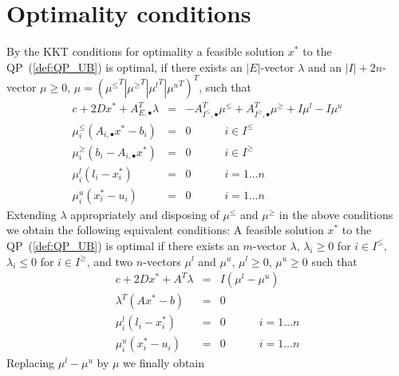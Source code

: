 \documentclass[a4paper]{article}
\begin{document}
\section{Optimality conditions}
By the KKT conditions for optimality a feasible solution $x^{*}$ to the
QP~(\ref{def:QP_UB}) is optimal, if there exists an $\left|E\right|$-vector
$\lambda$ and an $\left|I\right|+2n$-vector $\mu \geq 0$,
$\mu=\left({\mu^{\leq}}^{T}\left|\right. {\mu^{\geq}}^{T} \left|\right.
{\mu^{l}}^{T} \left|\right. {\mu^{u}}^{T}\right)^{T}$, such that
\begin{eqnarray*}
c + 2Dx^{*} +A_{E, \bullet}^{T}\lambda
&=&
-A_{I^{\leq}, \bullet}^{T}\mu^{\leq} + A_{I^{\geq}, \bullet}^{T}\mu^{\geq}
+I\mu^{l} -I\mu^{u}  \\
\mu_{i}^{\leq}\left(A_{i, \bullet}x^{*}-b_{i}\right)
&=&
0 \quad\quad\quad i \in I^{\leq}\\
\mu_{i}^{\geq}\left(b_{i}-A_{i, \bullet}x^{*}\right)
&=&
0 \quad\quad\quad i \in I^{\geq}\\
\mu_{i}^{l}\left(l_{i}-x_{i}^{*}\right)
&=& 
0 \quad\quad\quad i= 1 \dots n\\
\mu_{i}^{u}\left(x_{i}^{*}-u_{i}\right)
&=&
0 \quad\quad\quad i=1 \dots n
\end{eqnarray*}
Extending $\lambda$ appropriately and disposing of $\mu^{\leq}$ and $\mu^{\geq}$ in the above conditions we obtain
the following equivalent conditions:
A feasible solution $x^{*}$ to the QP~(\ref{def:QP_UB}) is optimal if there exists an $m$-vector $\lambda$, $\lambda_{i} \geq 0$ for $i \in I^{\leq}$,
$\lambda_{i} \leq 0$ for $i \in I^{\geq}$, and two $n$-vectors $\mu^{l}$ and
$\mu^{u}$, $\mu^{l} \geq 0$, $\mu^{u} \geq 0$ such that
\begin{eqnarray*}
c + 2Dx^{*} +A^{T}\lambda
&=&
I\left(\mu^{l} -\mu^{u}\right)  \\
\lambda^{T}\left(Ax^{*}-b\right)
&=&
0 \\
\mu_{i}^{l}\left(l_{i}-x_{i}^{*}\right)
&=& 
0 \quad\quad\quad i= 1 \dots n\\
\mu_{i}^{u}\left(x_{i}^{*}-u_{i}\right)
&=&
0 \quad\quad\quad i=1 \dots n
\end{eqnarray*}
Replacing $\mu^{l}-\mu^{u}$ by $\mu$ we finally obtain
\end{document}
